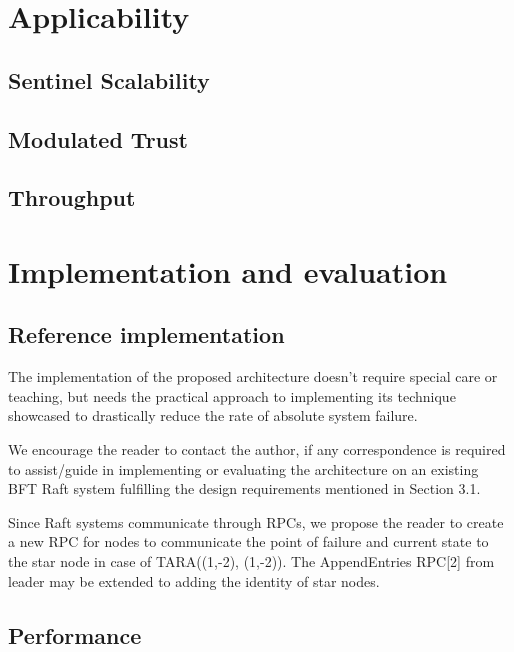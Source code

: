 \documentclass[]{article}
\begin{document}

\section{Applicability}
\subsection{Sentinel Scalability}
\subsection{Modulated Trust}
\subsection{Throughput}

\section{Implementation and evaluation}
\subsection{Reference implementation}
The implementation of the proposed architecture doesn’t require special care or teaching, but needs the practical approach to implementing its technique showcased to drastically reduce the rate of absolute system failure. 

We encourage the reader to contact the author, if any correspondence is required to assist/guide in implementing or evaluating the architecture on an existing BFT Raft system fulfilling the design requirements mentioned in Section 3.1.

Since Raft systems communicate through RPCs, we propose the reader to create a new RPC for nodes to communicate the point of failure and current state to the star node in case of TARA((1,-2), (1,-2)). The AppendEntries RPC[2] from leader may be extended to adding the identity of star nodes.

\subsection{Performance}
\end{document}
